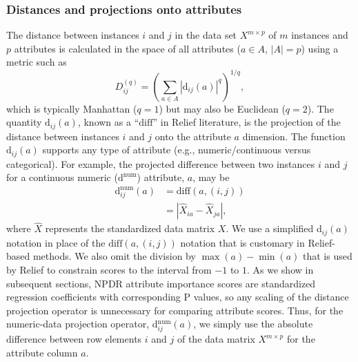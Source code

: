 \documentclass[10pt]{article}
\begin{document}
\subsubsection{Distances and projections onto attributes}
The distance between instances $i$ and $j$ in the data set $X^{m \times p}$ of $m$ instances and $p$ attributes is calculated in the space of all attributes ($a \in A$, $|A|=p$) using a metric such as
\begin{equation}\label{eq:D}
D^{(q)}_{ij}=\left(\sum_{a\in A}|\text{d}_{ij}(a)|^q\right)^{1/q},
\end{equation}
which is typically Manhattan ($q=1$) but may also be Euclidean ($q=2$). The quantity 
$\text{d}_{ij}(a)$,
known as a ``$\text{diff}$'' in Relief literature, is the projection of the distance between instances $i$ and $j$ onto the attribute $a$ dimension. The 
function $\text{d}_{ij}(a)$ supports any type of attribute
(e.g., numeric/continuous versus categorical).
For example, the projected difference between two instances $i$ and $j$ for a continuous numeric ($\text{d}^{\text{num}}$) attribute, $a$, may be
\begin{equation}\label{eq:diff}
\begin{aligned}
\text{d}^{\text{num}}_{ij}(a)&=\text{diff}(a,(i,j))\\
                                            & = {|\hat{X}_{ia}-\hat{X}_{ja}|},
\end{aligned}
\end{equation}
where $\hat{X}$ represents the standardized data matrix $X$.
We use a simplified d$_{ij}(a)$ notation in place of the $\text{diff}(a,(i,j))$ notation that is customary in Relief-based methods.
We also omit the division by $\max(a)-\min(a)$ that is used by Relief to constrain scores to the interval from $-1$ to $1$.
As we show in subsequent sections, NPDR attribute importance scores are standardized regression coefficients with corresponding P values, so any scaling of the distance projection operator is unnecessary for comparing attribute scores. 
Thus, for the numeric-data projection operator, d$^{\text{num}}_{ij}(a)$, we simply use the absolute difference between row elements $i$ and $j$ of the data matrix $X^{m \times p}$ for the attribute column $a$. 
\end{document}
